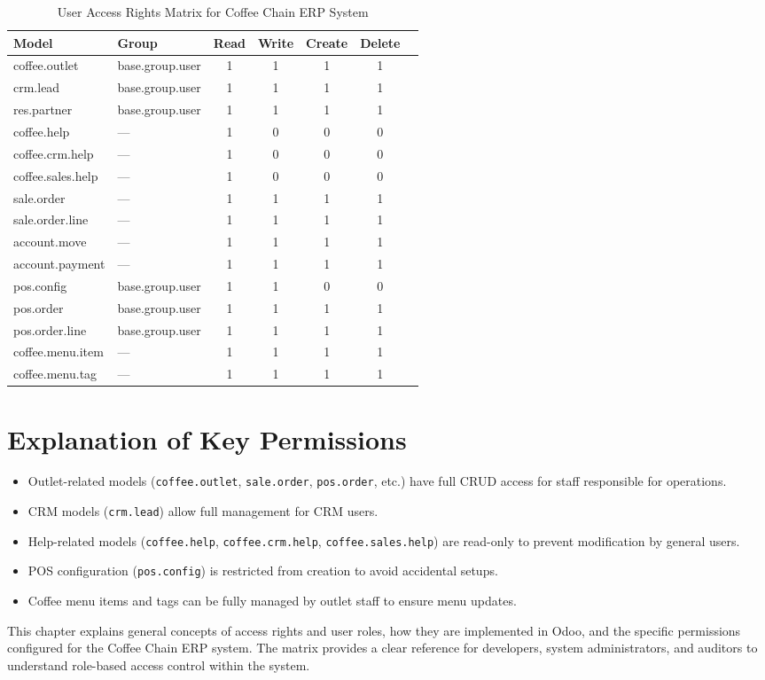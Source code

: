 \begin{table}[H]
\centering
\begin{tabular}{|p{5cm}|p{4cm}|c|c|c|c|c|}
\hline
\textbf{Model} & \textbf{Group} & \textbf{Read} & \textbf{Write} & \textbf{Create} & \textbf{Delete} \\
\hline
coffee.outlet & base.group.user & 1 & 1 & 1 & 1 \\
crm.lead & base.group.user & 1 & 1 & 1 & 1 \\
res.partner & base.group.user & 1 & 1 & 1 & 1 \\
coffee.help & — & 1 & 0 & 0 & 0 \\
coffee.crm.help & — & 1 & 0 & 0 & 0 \\
coffee.sales.help & — & 1 & 0 & 0 & 0 \\
sale.order & — & 1 & 1 & 1 & 1 \\
sale.order.line & — & 1 & 1 & 1 & 1 \\
account.move & — & 1 & 1 & 1 & 1 \\
account.payment & — & 1 & 1 & 1 & 1 \\
pos.config & base.group.user & 1 & 1 & 0 & 0 \\
pos.order & base.group.user & 1 & 1 & 1 & 1 \\
pos.order.line & base.group.user & 1 & 1 & 1 & 1 \\
coffee.menu.item & — & 1 & 1 & 1 & 1 \\
coffee.menu.tag & — & 1 & 1 & 1 & 1 \\
\hline
\end{tabular}
\caption{User Access Rights Matrix for Coffee Chain ERP System}
\end{table}




\section*{Explanation of Key Permissions}
\begin{itemize}
    \item Outlet-related models (\texttt{coffee.outlet}, \texttt{sale.order}, \texttt{pos.order}, etc.) have full CRUD access for staff responsible for operations.
    \item CRM models (\texttt{crm.lead}) allow full management for CRM users.
    \item Help-related models (\texttt{coffee.help}, \texttt{coffee.crm.help}, \texttt{coffee.sales.help}) are read-only to prevent modification by general users.
    \item POS configuration (\texttt{pos.config}) is restricted from creation to avoid accidental setups.
    \item Coffee menu items and tags can be fully managed by outlet staff to ensure menu updates.
\end{itemize}


This chapter explains general concepts of access rights and user roles, how they are implemented in Odoo, and the specific permissions configured for the Coffee Chain ERP system. The matrix provides a clear reference for developers, system administrators, and auditors to understand role-based access control within the system.
